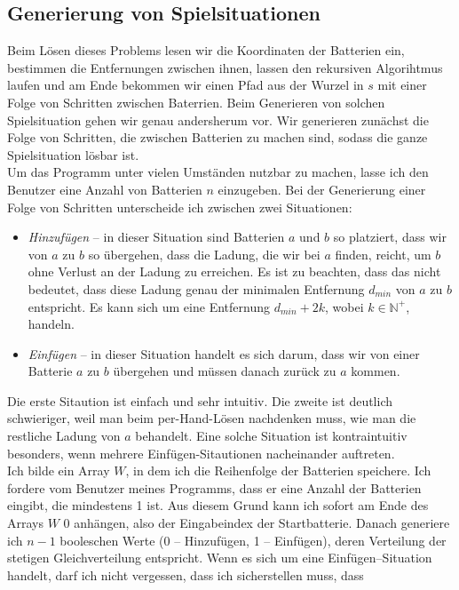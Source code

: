 \documentclass[a4paper,10pt,ngerman]{scrartcl}
\begin{document}
\subsection{Generierung von Spielsituationen}
Beim Lösen dieses Problems lesen wir die Koordinaten der Batterien ein, bestimmen die Entfernungen zwischen ihnen,
lassen den rekursiven Algorihtmus laufen und am Ende bekommen wir einen Pfad aus der Wurzel in $s$ mit einer Folge von
Schritten zwischen Baterrien. Beim Generieren von solchen Spielsituation gehen wir genau andersherum vor.
Wir generieren zunächst die Folge von Schritten, die zwischen Batterien zu machen sind, sodass die ganze 
Spielsituation lösbar ist.\\
Um das Programm unter vielen Umständen nutzbar zu machen, lasse ich den Benutzer eine Anzahl von Batterien $n$ einzugeben.
Bei der Generierung einer Folge von Schritten unterscheide ich zwischen zwei Situationen:
\begin{itemize}
  \item \textit{Hinzufügen} -- in dieser Situation sind Batterien $a$ und $b$ so platziert, 
    dass wir von $a$ zu $b$ so übergehen, dass die Ladung, die wir bei $a$ finden, reicht, um $b$ ohne Verlust an der Ladung
    zu erreichen. Es ist zu beachten, dass das nicht bedeutet, dass diese Ladung genau der minimalen Entfernung $d_{min}$ von $a$ zu $b$ entspricht.
    Es kann sich um eine Entfernung $d_{min}+2k$, wobei $k \in \mathbb{N^{+}}$, handeln.
  \item \textit{Einfügen} -- in dieser Situation handelt es sich darum, dass wir von einer Batterie $a$ zu $b$ übergehen und müssen danach
   zurück zu $a$ kommen.
\end{itemize}
Die erste Sitaution ist einfach und sehr intuitiv. Die zweite ist deutlich schwieriger, weil man beim per-Hand-Lösen nachdenken muss,
wie man die restliche Ladung von $a$ behandelt. Eine solche Situation ist kontraintuitiv besonders, wenn mehrere Einfügen-Sitautionen
nacheinander auftreten.\\
Ich bilde ein Array $W$, in dem ich die Reihenfolge der Batterien speichere.
Ich fordere vom Benutzer meines Programms, dass er eine Anzahl der Batterien eingibt, die mindestens 1 ist.
Aus diesem Grund kann ich sofort am Ende des Arrays $W$ 0 anhängen, also der Eingabeindex der Startbatterie.
Danach generiere ich $n-1$ booleschen Werte (0 -- Hinzufügen, 1 -- Einfügen), deren Verteilung der stetigen Gleichverteilung entspricht.
Wenn es sich um eine Einfügen--Situation handelt, darf ich nicht vergessen, dass ich sicherstellen muss, dass
\end{document}
